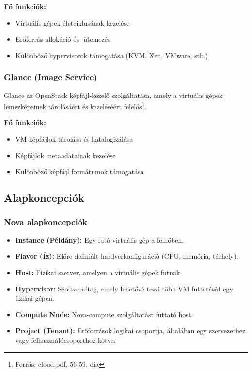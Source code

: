 \documentclass[a4paper,12pt]{article}
\begin{document}
    \textbf{Fő funkciók:}
    \begin{itemize}
        \item Virtuális gépek életciklusának kezelése
        \item Erőforrás-allokáció és -ütemezés
        \item Különböző hypervisorok támogatása (KVM, Xen, VMware, stb.)
    \end{itemize}

    \subsubsection{Glance (Image Service)}

    Glance az OpenStack képfájl-kezelő szolgáltatása, amely a virtuális gépek lemezképeinek tárolásáért és kezeléséért felelős\footnote{Forrás: cloud.pdf, 56-59. dia}.

    \textbf{Fő funkciók:}
    \begin{itemize}
        \item VM-képfájlok tárolása és katalogizálása
        \item Képfájlok metaadatainak kezelése
        \item Különböző képfájl formátumok támogatása
    \end{itemize}

    \subsection{Alapkoncepciók}

    \subsubsection{Nova alapkoncepciók}

    \begin{itemize}
        \item \textbf{Instance (Példány):} Egy futó virtuális gép a felhőben.
        \item \textbf{Flavor (Íz):} Előre definiált hardverkonfiguráció (CPU, memória, tárhely).
        \item \textbf{Host:} Fizikai szerver, amelyen a virtuális gépek futnak.
        \item \textbf{Hypervisor:} Szoftverréteg, amely lehetővé teszi több VM futtatását egy fizikai gépen.
        \item \textbf{Compute Node:} Nova-compute szolgáltatást futtató host.
        \item \textbf{Project (Tenant):} Erőforrások logikai csoportja, általában egy szervezethez vagy felhasználócsoporthoz kötve.
    \end{itemize}
\end{document}
